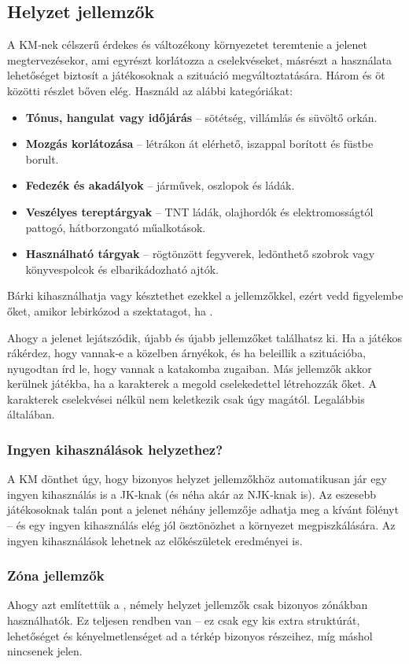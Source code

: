 \subsection{Helyzet jellemzők}

A KM‑nek célszerű érdekes és változékony környezetet teremtenie a jelenet megtervezésekor, ami egyrészt korlátozza a cselekvéseket, másrészt a használata lehetőséget biztosít a játékosoknak a szituáció megváltoztatására. Három és öt közötti részlet bőven elég. Használd az alábbi kategóriákat:

\begin{itemize}
    \item \textbf{Tónus, hangulat vagy időjárás} – sötétség, villámlás és süvöltő orkán.
    \item \textbf{Mozgás korlátozása} – létrákon át elérhető, iszappal borított és füstbe borult.
    \item \textbf{Fedezék és akadályok} – járművek, oszlopok és ládák.
    \item \textbf{Veszélyes tereptárgyak} – TNT ládák, olajhordók és elektromosságtól pattogó, hátborzongató műalkotások.
    \item \textbf{Használható tárgyak} – rögtönzött fegyverek, ledönthető szobrok vagy könyvespolcok és elbarikádozható ajtók.
\end{itemize}

Bárki kihasználhatja vagy késztethet ezekkel a jellemzőkkel, ezért vedd figyelembe őket, amikor lebirkózod a szektatagot, ha .

Ahogy a jelenet lejátszódik, újabb és újabb jellemzőket találhatsz ki. Ha a játékos rákérdez, hogy vannak‑e a közelben árnyékok, és ha beleillik a szituációba, nyugodtan írd le, hogy  vannak a katakomba zugaiban. Más jellemzők akkor kerülnek játékba, ha a karakterek a megold cselekedettel létrehozzák őket. A karakterek cselekvései nélkül nem keletkezik csak úgy  magától. Legalábbis általában.

\subsubsection{Ingyen kihasználások helyzethez?}

A KM dönthet úgy, hogy bizonyos helyzet jellemzőkhöz automatikusan jár egy ingyen kihasználás is a JK‑knak (és néha akár az NJK‑knak is). Az eszesebb játékosoknak talán pont a jelenet néhány jellemzője adhatja meg a kívánt fölényt – és egy ingyen kihasználás elég jól ösztönözhet a környezet megpiszkálására. Az ingyen kihasználások lehetnek az előkészületek eredményei is.

\subsubsection{Zóna jellemzők}

Ahogy azt említettük a , némely helyzet jellemzők csak bizonyos zónákban használhatók. Ez teljesen rendben van – ez csak egy kis extra struktúrát, lehetőséget és kényelmetlenséget ad a térkép bizonyos részeihez, míg máshol nincsenek jelen.
